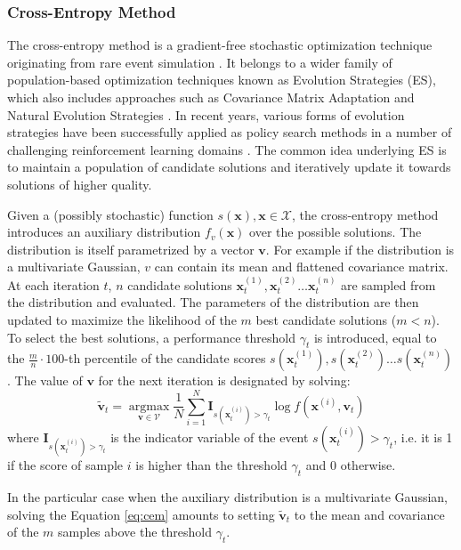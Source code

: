 \documentclass[letterpaper]{article} %
\begin{document}
\subsubsection{Cross-Entropy Method} The cross-entropy method is a gradient-free stochastic optimization technique originating from rare event simulation \cite{Rubinstein1999,DeBoer2005}. It belongs to a wider family of population-based optimization techniques known as Evolution Strategies (ES), which also includes approaches such as Covariance Matrix Adaptation \cite{Hansen2O01} and Natural Evolution Strategies \cite{Wierstra2014}. In recent years, various forms of evolution strategies have been successfully applied as policy search methods in a number of challenging reinforcement learning domains \cite{Mannor2003,Salimans2017,Chrabaszcz2018,Conti2018}. The common idea underlying ES is to maintain a population of candidate solutions and iteratively update it towards solutions of higher quality.

Given a (possibly stochastic) function $s(\mathbf{x}), \mathbf{x} \in \mathcal{X}$, the cross-entropy method introduces an auxiliary distribution $f_v(\mathbf{x})$ over the possible solutions. The distribution is itself parametrized by a vector $\mathbf{v}$. For example if the distribution is a multivariate Gaussian, $v$ can contain its mean and flattened covariance matrix. At each iteration $t$, $n$ candidate solutions $\mathbf{x}^{(1)}_t, \mathbf{x}^{(2)}_t \ldots \mathbf{x}^{(n)}_t$ are sampled from the distribution and evaluated. The parameters of the distribution are then updated to maximize the likelihood of the $m$ best candidate solutions ($m<n$). To select the best solutions, a performance threshold $\gamma_t$ is introduced, equal to the $\frac{m}{n}\cdot100$-th percentile of the candidate scores $s(\mathbf{x}^{(1)}_t), s(\mathbf{x}^{(2)}_t) \ldots s(\mathbf{x}^{(n)}_t)$. The value of $\mathbf{v}$ for the next iteration is designated by solving:
\begin{equation}
\label{eq:cem}
\mathbf{\tilde{v}}_{t} = \underset{\mathbf{v} \in \mathcal{V}}{\operatorname{argmax}} \frac{1}{N} \displaystyle{\sum_{i=1}^{N}}\mathbf{I}_{s(\mathbf{x}^{(i)}_t)>\gamma_{t}} \log f(\mathbf{x}^{(i)}, \textbf{v}_t)
\end{equation}
where $ \mathbf{I}_{s(\mathbf{x}^{(i)}_t)>\gamma_{t}} $ is the indicator variable of the event $ s(\mathbf{x}^{(i)}_t)>\gamma_{t} $, i.e. it is 1 if the score of sample $i$ is higher than the threshold $\gamma_t$ and 0 otherwise.

In the particular case when the auxiliary distribution is a multivariate Gaussian, solving the Equation \ref{eq:cem} amounts to setting $\mathbf{\tilde{v}}_{t}$ to the mean and covariance of the $m$ samples above the threshold $\gamma_t$.
\end{document}
